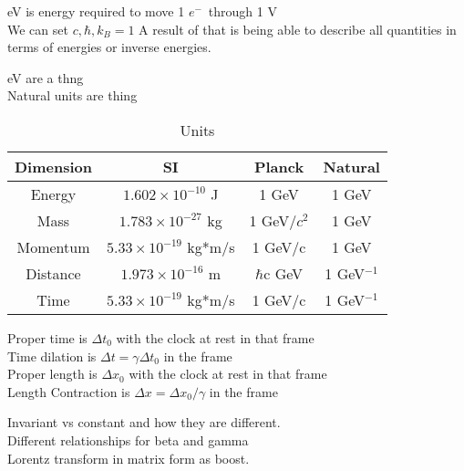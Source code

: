 \documentclass{article}
\date{Winter Semester 2022}
\author{\EC}
\def\elec{$e^{-}$\ }
\begin{document}
\maketitle

\begin{lecture}
    eV is energy required to move 1 \elec through 1 V \\
    We can set $c,\hbar,k_B=1$ A result of that is being able to describe all quantities in terms of energies or inverse energies. 
\end{lecture}
\begin{lecture}
    eV are a thng\\
    Natural units are thing
    \begin{table}[H]
        \centering
        \begin{tabular}{|c|c|c|c|}
            \hline
            Dimension & SI & Planck & Natural 
            \\\hline
            Energy & $1.602\times10^{-10}$ J & 1 GeV & 1 GeV \\\hline
            Mass & $1.783\times10^{-27}$ kg & 1 GeV/$c^2$ & 1 GeV\\\hline
            Momentum & $5.33\times10^{-19}$ kg*m/s & 1 GeV/c & 1 GeV\\\hline
            Distance & $1.973\times10^{-16}$ m & $\hbar$c GeV & 1 GeV$^{-1}$\\\hline
            Time & $5.33\times10^{-19}$ kg*m/s & 1 GeV/c & 1 GeV$^{-1}$
            \\\hline
        \end{tabular}
        \caption{Units}
        \label{tab:units}
    \end{table}
    \noindent Proper time is $\Delta t_0$ with the clock at rest in that frame
    \\
    Time dilation is $\Delta t =\gamma\Delta t_0$ in the frame
    \\
    Proper length is $\Delta x_0$ with the clock at rest in that frame
    \\
    Length Contraction is $\Delta x =\Delta x_0/\gamma$ in the frame
\end{lecture}
\begin{lecture}
    Invariant vs constant and how they are different. 
    \\
    Different relationships for beta and gamma
    \\
    Lorentz transform in matrix form as boost.
    \\
\end{lecture}
\end{document}
